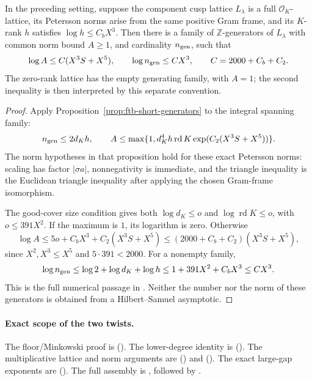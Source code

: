 \begin{srproposition}
\label{prop:ftb-arbitrary-weight-short-generators}
In the preceding setting, suppose the component cusp lattice
\(L_\lambda\) is a full \(\mathcal O_K\)-lattice, its Petersson
norms arise from the same positive Gram frame, and its
\(K\)-rank \(h\) satisfies \(\log h\le C_bX^3\).
Then there is a family of \(\mathbb Z\)-generators of \(L_\lambda\)
with common norm bound \(A\ge1\), and cardinality \(n_{\rm gen}\),
such that
\[
 \log A\le C(X^3S+X^5),\qquad
 \log n_{\rm gen}\le CX^3,\qquad
                       C=2000+C_b+C_2 .
\]
The zero-rank lattice has the empty generating family, with
\(A=1\); the second inequality is then interpreted by this
separate convention.
\end{srproposition}
\begin{proof}
Apply Proposition~\ref{prop:ftb-short-generators} to the integral
spanning family:
\[
 n_{\rm gen}\le2d_Kh,\qquad
 A\le\max\{1,d_K^4h\operatorname{rd}K
                         \exp(C_2(X^3S+X^5))\}.
\]
The norm hypotheses in that proposition hold for these exact
Petersson norms: scaling has factor \(|\sigma a|\), nonnegativity
is immediate, and the triangle inequality is the Euclidean
triangle inequality after applying the chosen Gram-frame
isomorphism.

The good-cover size condition gives both
\(\log d_K\le o\) and \(\log\operatorname{rd}K\le o\), with
\(o\le391X^2\).
If the maximum is \(1\), its logarithm is zero.
Otherwise
\[
 \log A\le5o+C_bX^3+C_2(X^3S+X^5)
          \le(2000+C_b+C_2)(X^3S+X^5),
\]
since \(X^2,X^3\le X^5\) and \(5\cdot391<2000\).
For a nonempty family,
\[
 \log n_{\rm gen}\le\log2+\log d_K+\log h
        \le1+391X^2+C_bX^3\le CX^3 .
\]
This is the full numerical passage in
.
Neither the number nor the norm of these generators is obtained
from a Hilbert--Samuel asymptotic.
\end{proof}

\paragraph{Exact scope of the two twists.}
The floor/Minkowski proof is
().
The lower-degree identity is
().
The multiplicative lattice and norm arguments are
() and
().
The exact large-gap exponents are
().
The full assembly is ,
followed by .

